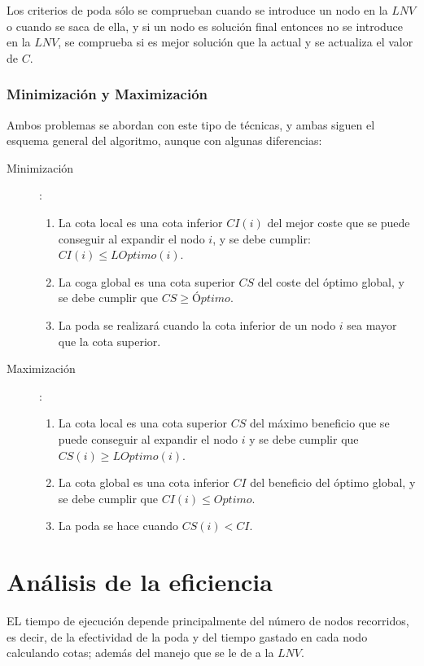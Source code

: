 \documentclass[10pt,a4paper,spanish]{report}
\theoremstyle{definition}
\theoremstyle{remark}
\begin{document}
Los criterios de poda sólo se comprueban cuando se introduce un nodo en la $LNV$ o cuando se saca de ella, y si un nodo es solución final entonces no se introduce en la $LNV$, se comprueba si es mejor solución que la actual y se actualiza el valor de $C$.

\subsubsection{\textcolor{coquelicot}Minimización y Maximización}

Ambos problemas se abordan con este tipo de técnicas, y ambas siguen el esquema general del algoritmo, aunque con algunas diferencias:

\begin{description}
    \item [Minimización]:
    \begin{enumerate}[---]
        \item La cota local es una cota inferior $CI(i)$ del mejor coste que se puede conseguir al expandir el nodo $i$, y se debe cumplir:$CI(i) \leq LOptimo(i)$.
        \item La coga global es una cota superior $CS$ del coste del óptimo global, y se debe cumplir que $CS \ge Óptimo$.
        \item La poda se realizará cuando la cota inferior de un nodo $i$ sea mayor que la cota superior.
    \end{enumerate}
    \item [Maximización]:
    \begin{enumerate}[---]
        \item La cota local es una cota superior $CS$ del máximo beneficio que se puede conseguir al expandir el nodo $i$ y se debe cumplir que $CS(i) \ge LOptimo(i)$.
        \item La cota global es una cota inferior $CI$ del beneficio del óptimo global, y se debe cumplir que $CI(i) \leq Optimo$.
        \item La poda se hace cuando $CS(i) < CI$.
    \end{enumerate}
\end{description}

\section{\textcolor{coquelicot}Análisis de la eficiencia}

EL tiempo de ejecución depende principalmente del número de nodos recorridos, es decir, de la efectividad de la poda y del tiempo gastado en cada nodo calculando cotas; además del manejo que se le de a la $LNV$.
\end{document}
